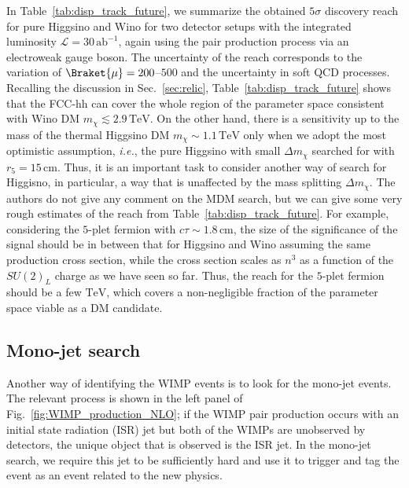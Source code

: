 \documentclass[12pt,twoside,book]{article}
\begin{document}
In Table~\ref{tab:disp_track_future}, we summarize the obtained $5\sigma$ discovery reach for pure Higgsino and Wino for two detector setups with the integrated luminosity $\mathcal{L} = 30\,\mathrm{ab}^{-1}$, again using the pair production process via an electroweak gauge boson.
The uncertainty of the reach corresponds to the variation of $\Braket{\mu}=200$--$500$ and the uncertainty in soft QCD processes.
Recalling the discussion in Sec.~\ref{sec:relic}, Table~\ref{tab:disp_track_future} shows that the FCC-hh can cover the whole region of the parameter space consistent with Wino DM $m_\chi \lesssim 2.9\,\mathrm{TeV}$.
On the other hand, there is a sensitivity up to the mass of the thermal Higgsino DM $m_\chi \sim 1.1\,\mathrm{TeV}$ only when we adopt the most optimistic assumption, \textit{i.e.}, the pure Higgsino with small $\Delta m_\chi$ searched for with $r_5 = 15\,\mathrm{cm}$.
Thus, it is an important task to consider another way of search for Higgisno, in particular, a way that is unaffected by the mass splitting $\Delta m_\chi$.
The authors do not give any comment on the MDM search, but we can give some very rough estimates of the reach from Table~\ref{tab:disp_track_future}.
For example, considering the $5$-plet fermion with $c\tau \sim 1.8\,\mathrm{cm}$, the size of the significance of the signal should be in between that for Higgsino and Wino assuming the same production cross section, while the cross section scales as $n^3$ as a function of the $SU(2)_L$ charge as we have seen so far.
Thus, the reach for the $5$-plet fermion should be a few $\mathrm{TeV}$, which covers a non-negligible fraction of the parameter space viable as a DM candidate.


\subsection{Mono-jet search}
\label{sec:mono-jet}

Another way of identifying the WIMP events is to look for the mono-jet events.
The relevant process is shown in the left panel of Fig.~\ref{fig:WIMP_production_NLO}; if the WIMP pair production occurs with an initial state radiation (ISR) jet but both of the WIMPs are unobserved by detectors, the unique object that is observed is the ISR jet.
In the mono-jet search, we require this jet to be sufficiently hard and use it to trigger and tag the event as an event related to the new physics.
\end{document}
